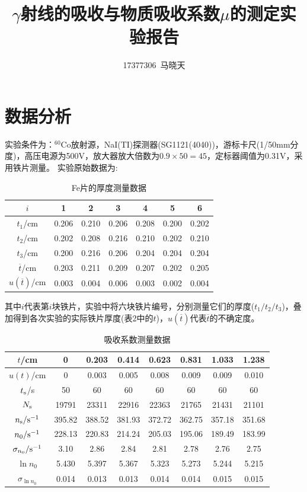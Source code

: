 \documentclass[UTF8]{ctexart}
\title{$ \gamma $射线的吸收与物质吸收系数$ \mu $的测定实验报告}
\author{17377306\ 马晓天}
\begin{document}
\maketitle

\thispagestyle{empty}
\section{数据分析}
实验条件为：$^{60}$Co放射源，NaI(TI)探测器(SG1121(4040))，游标卡尺(1/50mm分度)，高压电源为500V，放大器放大倍数为$ 0.9\times50=45 $，定标器阈值为0.31V，采用铁片测量。
实验原始数据为:
\begin{table}[H]
	\centering
	\caption{Fe片的厚度测量数据}
	\begin{tabular}{ccccccc}
		\hline
		$ i $ & 1 & 2 & 3 & 4 & 5 & 6\\
		\hline
		$ t_{1} $/cm & 0.206 & 0.210 & 0.206 & 0.208 & 0.200 & 0.202\\
		$ t_{2} $/cm & 0.202  & 0.208  & 0.216  & 0.210  & 0.202  & 0.210\\
		$ t_{3} $/cm & 0.200  & 0.216  & 0.206  & 0.204  & 0.204  & 0.204\\
		$ \overline{t}$/cm  & 0.203  & 0.211  & 0.209  & 0.207  & 0.202  & 0.205\\
		$ u(\overline{t}) $/cm & 0.003  & 0.004  & 0.006  & 0.003  & 0.002  & 0.004\\
		\hline
	\end{tabular}
\end{table}
其中$ i $代表第$ i $块铁片，实验中将六块铁片编号，分别测量它们的厚度($t_1/t_2/t_3$)，叠加得到各次实验的实际铁片厚度(表2中的$ t $)，$ u(\overline{t})$代表$ \overline{t} $的不确定度。
\begin{table}[H]
	\centering
	\caption{吸收系数测量数据}
	\begin{tabular}{cccccccc}
		\hline
		$ t $/cm & 0  & 0.203  & 0.414  & 0.623  & 0.831  & 1.033  & 1.238\\
		\hline
		$ u(t)$/cm & 0  & 0.003  & 0.005  & 0.008  & 0.009  & 0.009  & 0.010\\
		$ t_{\rm s} $/s & 50 & 60 & 60 & 60 & 60 & 60 & 60\\
		$ N_{\rm s} $ & 19791 & 23311 & 22916 & 22363 & 21765 & 21431 & 21101\\
		$ n_{\rm s}/\rm s^{-1} $ & 395.82  & 388.52  & 381.93  & 372.72  & 362.75  & 357.18  & 351.68 \\
		$ n_{0}/\rm s^{-1}$ & 228.13  & 220.83  & 214.24  & 205.03  & 195.06  & 189.49  & 183.99\\
		$ \sigma_{n_{0}}/\rm s^{-1} $ & 3.10  & 2.86  & 2.84  & 2.81  & 2.78  & 2.76  & 2.75\\
		$ \ln n_{0}$  & 5.430  & 5.397  & 5.367  & 5.323  & 5.273  & 5.244  & 5.215\\
		$ \sigma_{\ln n_{0}} $ & 0.014  & 0.013  & 0.013  & 0.014  & 0.014  & 0.015  & 0.015\\
		\hline
	\end{tabular}
\end{table}
\end{document}
